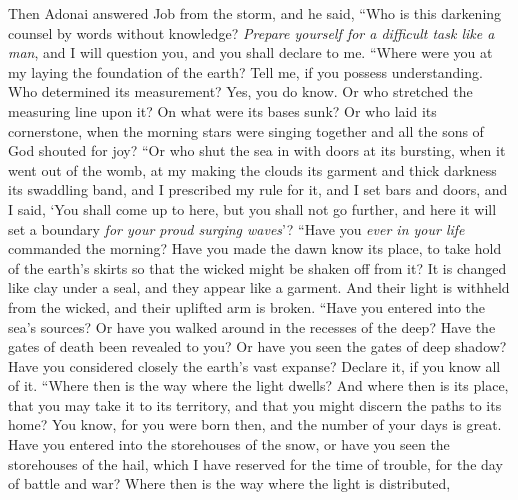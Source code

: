 \begin{biblechapter} %
 Then Adonai answered Job from the storm, and he said,
\verse “Who is this darkening counsel 
by words without knowledge?
\verse \textit{Prepare yourself for a difficult task like a man}, 
and I will question you, and you shall declare to me.
 “Where were you at my laying the foundation of the earth? 
Tell me, if you possess understanding.
\verse Who determined its measurement? Yes, you do know. 
Or who stretched the measuring line upon it?
\verse On what were its bases sunk? 
Or who laid its cornerstone,
\verse when the morning stars were singing together 
and all the sons of God shouted for joy?
\verse “Or who shut the sea in with doors 
at its bursting, when it went out of the womb,
\verse at my making the clouds its garment 
and thick darkness its swaddling band,
\verse and I prescribed my rule for it, 
and I set bars and doors,
\verse and I said, ‘You shall come up to here, but you shall not go further, 
and here it will set a boundary \textit{for your proud surging waves}’?
\verse “Have you \textit{ever in your life} commanded the morning? 
Have you made the dawn know its place,
\verse to take hold of the earth’s skirts 
so that the wicked might be shaken off from it?
\verse It is changed like clay under a seal, 
and they appear like a garment.
\verse And their light is withheld from the wicked, 
and their uplifted arm is broken.
\verse “Have you entered into the sea’s sources? 
Or have you walked around in the recesses of the deep?
\verse Have the gates of death been revealed to you? 
Or have you seen the gates of deep shadow?
\verse Have you considered closely the earth’s vast expanse? 
Declare it, if you know all of it.
\verse “Where then is the way where the light dwells? 
And where then is its place,
\verse that you may take it to its territory, 
and that you might discern the paths to its home?
\verse You know, for you were born then, 
and the number of your days is great.
\verse Have you entered into the storehouses of the snow, 
or have you seen the storehouses of the hail,
\verse which I have reserved for the time of trouble, 
for the day of battle and war?
\verse Where then is the way where the light is distributed, 

\end{biblechapter}
